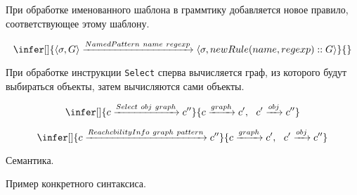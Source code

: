 При обработке именованного шаблона в граммтику добавляется новое правило, соответствующее этому шаблону.

$$
\infer[]{\langle\sigma, G\rangle \xrightarrow{NamedPattern \ name \ regexp} \langle\sigma, newRule(name, regexp)::G\rangle}{}
$$

При обработке инструкции \verb|Select| сперва вычисляется граф, из которого будут выбираться объекты, затем вычисляются сами объекты.

$$
\infer[]{c \xrightarrow{Select \ obj \ graph} c''}{c \xrightarrow{graph} c', \ \ c' \xrightarrow{obj} c''}
$$

$$
\infer[]{c \xrightarrow{ReachcbilityInfo \ graph \ pattern} c''}{c \xrightarrow{graph} c', \ \ c' \xrightarrow{obj} c''}
$$




Семантика. 


Пример конкретного синтаксиса.

